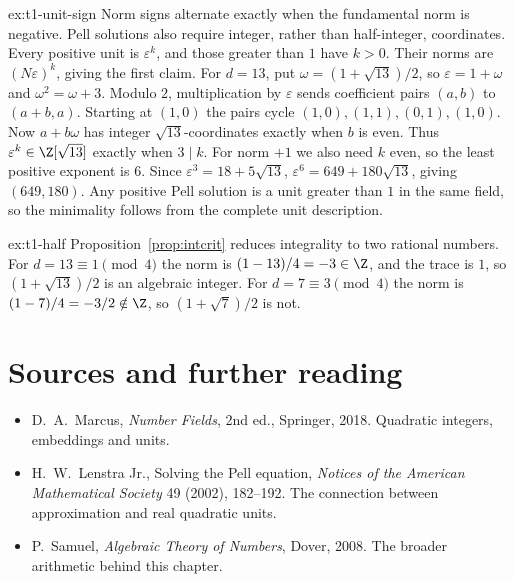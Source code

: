 \begin{solution}{ex:t1-unit-sign}
\idea Norm signs alternate exactly when the fundamental norm is negative.
Pell solutions also require integer, rather than half-integer, coordinates.
\writeup Every positive unit is $\varepsilon^k$, and those greater than
$1$ have $k>0$. Their norms are $(N\varepsilon)^k$, giving the first claim.
For $d=13$, put $\omega=(1+\sqrt{13})/2$, so $\varepsilon=1+\omega$ and
$\omega^2=\omega+3$. Modulo $2$, multiplication by $\varepsilon$
sends coefficient pairs $(a,b)$ to $(a+b,a)$.
Starting at $(1,0)$ the pairs cycle
$(1,0),(1,1),(0,1),(1,0)$.
Now $a+b\omega$ has integer $\sqrt{13}$-coordinates exactly when $b$ is even.
Thus $\varepsilon^k\in\Z[\sqrt{13}]$ exactly when $3\mid k$.
For norm $+1$ we also need $k$ even, so the least positive exponent is $6$.
Since $\varepsilon^3=18+5\sqrt{13}$,
$\varepsilon^6=649+180\sqrt{13}$, giving $(649,180)$.
Any positive Pell solution is a unit greater than $1$ in the same field,
so the minimality follows from the complete unit description.
\end{solution}

\begin{solution}{ex:t1-half}
\idea Proposition~\ref{prop:intcrit} reduces integrality to two rational numbers.
\writeup For $d=13\equiv 1\pmod 4$ the norm is $(1-13)/4=-3\in\Z$, and the trace is $1$, so $(1+\sqrt{13})/2$ is an algebraic integer. For $d=7\equiv 3\pmod 4$ the norm is $(1-7)/4=-3/2\notin\Z$, so $(1+\sqrt{7})/2$ is not.
\end{solution}

\section*{Sources and further reading}
\begin{itemize}
\item D.~A.~Marcus, \emph{Number Fields}, 2nd ed., Springer, 2018.
Quadratic integers, embeddings and units.
\item H.~W.~Lenstra Jr., Solving the Pell equation,
\emph{Notices of the American Mathematical Society} 49 (2002), 182--192.
The connection between approximation and real quadratic units.
\item P.~Samuel, \emph{Algebraic Theory of Numbers}, Dover, 2008.
The broader arithmetic behind this chapter.
\end{itemize}
